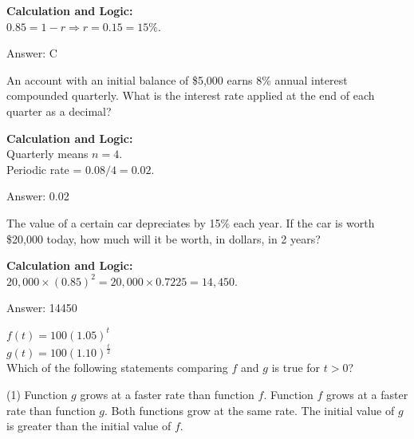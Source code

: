 \documentclass[11pt,paper=a4,answers]{exam}
\begin{document}
\begin{questions}
\begin{solution}
\textbf{Calculation and Logic:} \\
$0.85 = 1 - r \Rightarrow r = 0.15 = 15\%$.

\vspace{25pt}

Answer: \colorbox{yellow!100}{C}
\end{solution}

\vspace{40pt}

\question
An account with an initial balance of \$5,000 earns 8\% annual interest compounded quarterly. What is the interest rate applied at the end of each quarter as a decimal?

\begin{solution}
\textbf{Calculation and Logic:} \\
Quarterly means $n = 4$. \\
Periodic rate = $0.08 / 4 = 0.02$.

\vspace{25pt}

Answer: \colorbox{yellow!100}{0.02}
\end{solution}

\vspace{40pt}

\question
The value of a certain car depreciates by 15\% each year. If the car is worth \$20,000 today, how much will it be worth, in dollars, in 2 years?

\begin{solution}
\textbf{Calculation and Logic:} \\
$20,000 \times (0.85)^2 = 20,000 \times 0.7225 = 14,450$.

\vspace{25pt}

Answer: \colorbox{yellow!100}{14450}
\end{solution}

\vspace{40pt}

\question
$f(t) = 100(1.05)^t$ \\
$g(t) = 100(1.10)^{\frac{t}{2}}$ \\
Which of the following statements comparing $f$ and $g$ is true for $t > 0$?
\begin{tasks}(1)
    \task Function $g$ grows at a faster rate than function $f$.
    \task Function $f$ grows at a faster rate than function $g$.
    \task Both functions grow at the same rate.
    \task The initial value of $g$ is greater than the initial value of $f$.
\end{tasks}


\end{questions}
\end{document}
